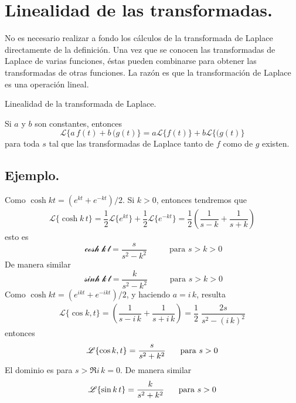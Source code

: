 \section{Linealidad de las transformadas.}
No es necesario realizar a fondo los cálculos de la transformada de Laplace directamente de la definición. Una vez que se conocen las transformadas de Laplace de varias funciones, éstas pueden combinarse para obtener las transformadas de otras funciones. La razón es que la transformación de Laplace es una operación lineal.
\begin{teo}{Linealidad de la transformada de Laplace.}

Si $a$ y $b$ son constantes, entonces
\begin{equation}
\mathscr{L} \{ a \, f(t) +  b \, (g(t) \} = a \mathscr{L} \{ f(t) \} + b \mathscr{L} \{ (g(t) \}
\label{eq:012}
\end{equation}
para toda $s$ tal que las transformadas de Laplace tanto de $f$ como de $g$ existen.
\end{teo}
\subsection*{Ejemplo.}
Como $\cosh kt = (e^{kt} + e^{-kt}) / 2$. Si $k > 0$, entonces tendremos que
\begin{align*}
\mathscr{L} \{ \cosh k \, t \} = \dfrac{1}{2} \mathscr{L} \{ e^{kt} \} + \dfrac{1}{2} \mathscr{L} \{ e^{-kt} \} = \dfrac{1}{2} \left( \dfrac{1}{s - k} + \dfrac{1}{s + k} \right)
\end{align*}
esto es
\begin{equation}
\mathscr{ \cosh k \, t} = \dfrac{s}{s^{2} - k^{2}} \hspace{1cm} \mbox{ para } s > k > 0
\label{eq:014}
\end{equation}
De manera similar
\begin{equation}
\mathscr{ \sinh k \, t} = \dfrac{k}{s^{2} - k^{2}} \hspace{1cm} \mbox{ para } s > k > 0
\label{eq:015}
\end{equation}
Como $\cosh kt = (e^{ikt} + e^{-ikt})/2$, y haciendo $a = i \, k$, resulta
\begin{align*}
\mathscr{L} \{ \cos k , t \} = \left( \dfrac{1}{s - i \, k} + \dfrac{1}{s + i \, k} \right) =  \dfrac{1}{2} \; \dfrac{2s}{s^{2} - (i \, k)^{2}}
\end{align*}
entonces
\begin{equation}
\mathscr{L} \{ \cos k , t \} = \dfrac{s}{s^{2} + k^{2}} \hspace{0.5cm} \mbox{ para } s > 0
\label{eq:016}
\end{equation}
El dominio es para $s > \Re{i \, k} = 0$. De manera similar
\begin{equation}
\mathscr{L} \{ \sin k \, t \} = \dfrac{k}{s^{2} + k^{2}} \hspace{0.5cm} \mbox{ para } s > 0
\label{eq:017}
\end{equation}
